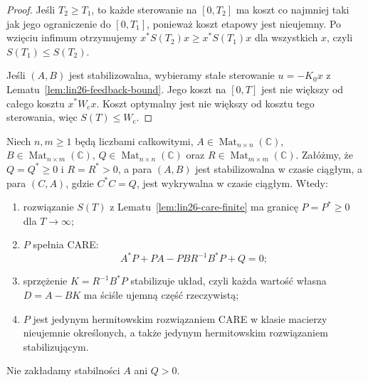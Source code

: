 \begin{proof}
Jeśli \(T_2\ge T_1\),
to każde sterowanie
na \([0,T_2]\)
ma koszt co najmniej
taki jak jego ograniczenie
do \([0,T_1]\), ponieważ
koszt etapowy jest nieujemny.
Po wzięciu infimum
otrzymujemy
\(x^*S(T_2)x\ge x^*S(T_1)x\)
dla wszystkich \(x\),
czyli \(S(T_1)\le S(T_2)\).

Jeśli \((A,B)\)
jest stabilizowalna,
wybieramy stałe sterowanie
\(u=-K_0x\)
z
Lematu~\ref{lem:lin26-feedback-bound}.
Jego koszt na \([0,T]\)
jest nie większy od
całego kosztu
\(x^*W_{\mathrm c}x\).
Koszt optymalny
jest nie większy od
kosztu tego sterowania,
więc \(S(T)\le W_{\mathrm c}\).
\end{proof}

\begin{twierdzenie}
\label{thm:lin26-care}
Niech \(n,m\ge1\) będą liczbami całkowitymi,
\(A\in\operatorname{Mat}_{n\times n}(\mathbb C)\),
\(B\in\operatorname{Mat}_{n\times m}(\mathbb C)\),
\(Q\in\operatorname{Mat}_{n\times n}(\mathbb C)\)
oraz \(R\in\operatorname{Mat}_{m\times m}(\mathbb C)\).
Załóżmy, że \(Q=Q^*\ge0\) i \(R=R^*>0\),
a para \((A,B)\)
jest stabilizowalna
w czasie ciągłym,
a para \((C,A)\),
gdzie \(C^*C=Q\),
jest wykrywalna
w czasie ciągłym.
Wtedy:
\begin{enumerate}[label=\textup{(\roman*)}]
 \item rozwiązanie \(S(T)\)
 z Lematu~\ref{lem:lin26-care-finite}
 ma granicę \(P=P^*\ge0\)
 dla \(T\to\infty\);
 \item \(P\) spełnia CARE:
 \[
 A^*P+PA-PBR^{-1}B^*P+Q=0;
 \]
 \item sprzężenie
 \(K=R^{-1}B^*P\)
 stabilizuje układ,
 czyli każda wartość własna
 \(D=A-BK\) ma ściśle
 ujemną część rzeczywistą;
 \item \(P\) jest jedynym
 hermitowskim rozwiązaniem
 CARE w klasie
 macierzy nieujemnie
 określonych, a także
 jedynym hermitowskim
 rozwiązaniem stabilizującym.
\end{enumerate}
Nie zakładamy
stabilności \(A\)
ani \(Q>0\).
\end{twierdzenie}
